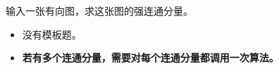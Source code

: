 \noindent 输入一张有向图，求这张图的强连通分量。

\begin{itemize}
    \item 没有模板题。
    \item \textbf{若有多个连通分量，需要对每个连通分量都调用一次算法。}
\end{itemize}
